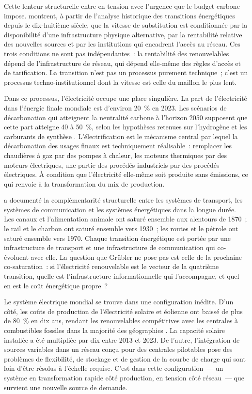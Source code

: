 Cette lenteur structurelle entre en tension avec l'urgence que le budget carbone impose. \textcite{fouquet_past_2012} montrent, à partir de l'analyse historique des transitions énergétiques depuis le dix-huitième siècle, que la vitesse de substitution est conditionnée par la disponibilité d'une infrastructure physique alternative, par la rentabilité relative des nouvelles sources et par les institutions qui encadrent l'accès au réseau. Ces trois conditions ne sont pas indépendantes~: la rentabilité des renouvelables dépend de l'infrastructure de réseau, qui dépend elle-même des règles d'accès et de tarification. La transition n'est pas un processus purement technique~; c'est un processus techno-institutionnel dont la vitesse est celle du maillon le plus lent.

Dans ce processus, l'électricité occupe une place singulière. La part de l'électricité dans l'énergie finale mondiale est d'environ 20~\% en 2023. Les scénarios de décarbonation qui atteignent la neutralité carbone à l'horizon 2050 supposent que cette part atteigne 40 à 50~\%, selon les hypothèses retenues sur l'hydrogène et les carburants de synthèse \parencite{iea_nze_2023}. L'électrification est le mécanisme central par lequel la décarbonation des usages finaux est techniquement réalisable~: remplacer les chaudières à gaz par des pompes à chaleur, les moteurs thermiques par des moteurs électriques, une partie des procédés industriels par des procédés électriques. À condition que l'électricité elle-même soit produite sans émissions, ce qui renvoie à la transformation du mix de production.

\textcite{grubler_technology_1998} a documenté la complémentarité structurelle entre les systèmes de transport, les systèmes de communication et les systèmes énergétiques dans la longue durée. Les canaux et l'alimentation animale ont saturé ensemble aux alentours de 1870~; le rail et le charbon ont saturé ensemble vers 1930~; les routes et le pétrole ont saturé ensemble vers 1970. Chaque transition énergétique est portée par une infrastructure de transport et une infrastructure de communication qui co-évoluent avec elle. La question que Grübler ne pose pas est celle de la prochaine co-saturation~: si l'électricité renouvelable est le vecteur de la quatrième transition, quelle est l'infrastructure informationnelle qui l'accompagne, et quel en est le coût énergétique propre~?

Le système électrique mondial se trouve dans une configuration inédite. D'un côté, les coûts de production de l'électricité solaire et éolienne ont baissé de plus de 80~\% en dix ans, rendant les renouvelables compétitives avec les centrales à combustibles fossiles dans la majorité des géographies \parencite{irena_costs_2023}. La capacité solaire installée a été multipliée par dix entre 2013 et 2023. De l'autre, l'intégration de sources variables dans un réseau conçu pour des centrales pilotables pose des problèmes de flexibilité, de stockage et de gestion de la courbe de charge qui sont loin d'être résolus à l'échelle requise. C'est dans cette configuration~--- un système en transformation rapide côté production, en tension côté réseau~--- que survient une nouvelle source de demande.


